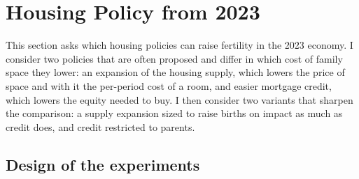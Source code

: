 \providecommand{\mocktodo}[1]{\textcolor{red}{[TODO: #1]}}

\section{Housing Policy from 2023}
\label{sec:policy}


This section asks which housing policies can raise fertility in the 2023
economy. I consider two policies that are often proposed and differ in which
cost of family space they lower: an expansion of the housing supply, which
lowers the price of space and with it the per-period cost of a room, and
easier mortgage credit, which lowers the equity needed to buy. I then consider
two variants that sharpen the comparison: a supply expansion sized to raise
births on impact as much as credit does, and credit restricted to parents.

\subsection{Design of the experiments}
\label{sec:policy-design}


